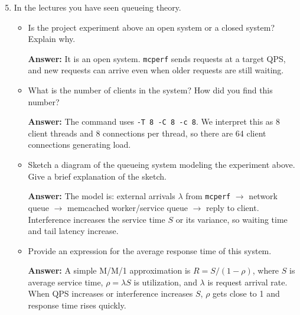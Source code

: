 \begin{enumerate}[label=(\alph*)]
    \setcounter{enumi}{4}
    \item In the lectures you have seen queueing theory.
    \begin{itemize}
        \item Is the project experiment above an open system or a closed system? Explain why.

        \textbf{Answer:} It is an open system. \texttt{mcperf} sends requests at a target QPS, and new requests can arrive even when older requests are still waiting.
        \\

        \item What is the number of clients in the system? How did you find this number?

        \textbf{Answer:} The command uses \texttt{-T 8 -C 8 -c 8}. We interpret this as 8 client threads and 8 connections per thread, so there are 64 client connections generating load.
        \\

        \item Sketch a diagram of the queueing system modeling the experiment above. Give a brief explanation of the sketch.

        \textbf{Answer:} The model is: external arrivals $\lambda$ from \texttt{mcperf} $\rightarrow$ network queue $\rightarrow$ memcached worker/service queue $\rightarrow$ reply to client. Interference increases the service time $S$ or its variance, so waiting time and tail latency increase.
        \\

        \item Provide an expression for the average response time of this system.

        \textbf{Answer:} A simple M/M/1 approximation is $R = S/(1-\rho)$, where $S$ is average service time, $\rho=\lambda S$ is utilization, and $\lambda$ is request arrival rate. When QPS increases or interference increases $S$, $\rho$ gets close to 1 and response time rises quickly.
    \end{itemize}
\end{enumerate}

